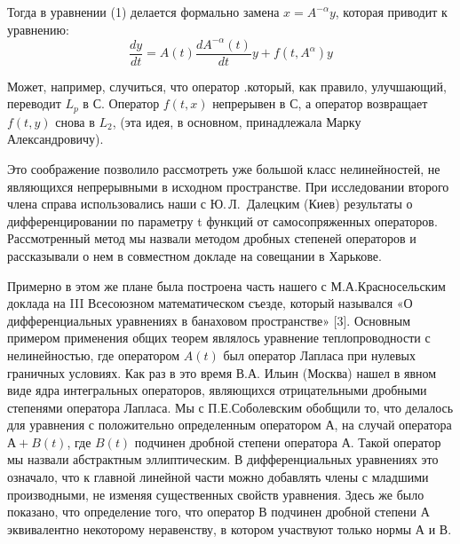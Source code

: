 Тогда в уравнении (1) делается формально замена $x = A^{-\alpha} y$, которая приводит к уравнению:
$$\frac{dy}{dt} = A(t)\frac{d A^{-\alpha} (t)}{dt} y + f(t, A^{\alpha}) y$$

Может, например, случиться, что оператор   .который, как правило, улучшающий, переводит $L_p$ в $С$. Оператор $f(t,x)$ непрерывен в $С$, а оператор   возвращает $f(t, y)$ снова в $L_2$, (эта идея, в основном, принадлежала Марку Александровичу).

Это соображение позволило рассмотреть уже большой класс нелинейностей,
не являющихся непрерывными в исходном пространстве.
При исследовании второго члена
\linebreak
справа использовались наши с Ю.\,Л.~Далецким (Киев) результаты о дифференцировании по параметру t функций от самосопряженных операторов. Рассмотренный метод мы назвали методом дробных степеней операторов и рассказывали о нем в совместном докладе на совещании в Харькове.

Примерно в этом же плане была построена часть нашего с М.А.Красносельским доклада на III Всесоюзном математическом съезде, который назывался «О дифференциальных уравнениях в банаховом пространстве» [3]. Основным примером применения общих теорем являлось уравнение теплопроводности с нелинейностью, где оператором $A(t)$ был оператор Лапласа при нулевых граничных условиях. Как раз в это время В.А. Ильин (Москва) нашел в явном виде ядра интегральных операторов, являющихся отрицательными дробными степенями оператора Лапласа.
Мы с П.Е.Соболевским обобщили то, что делалось для уравнения с положительно определенным оператором $А$, на случай оператора $А+B(t)$, где $B(t)$ подчинен дробной степени оператора $А$. Такой оператор мы назвали абстрактным эллиптическим. В дифференциальных уравнениях это означало, что к главной линейной части можно добавлять члены с младшими производными, не изменяя существенных свойств уравнения. Здесь же было показано, что определение того, что оператор $В$ подчинен дробной степени $А$ эквивалентно некоторому неравенству, в котором участвуют только нормы $А$ и $В$.

